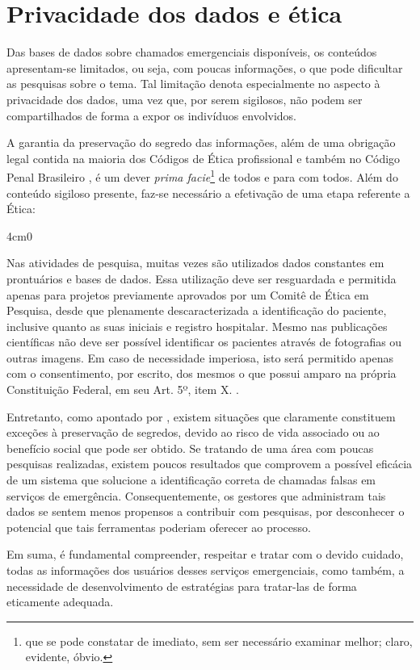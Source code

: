 \section{Privacidade dos dados e ética}
Das bases de dados sobre chamados emergenciais disponíveis, os conteúdos apresentam-se limitados, ou seja, com poucas informações, o que pode dificultar as pesquisas sobre o tema. Tal limitação denota  especialmente no aspecto à privacidade dos dados, uma vez que, por serem sigilosos, não podem ser compartilhados de forma a expor os indivíduos envolvidos.

A garantia da preservação do segredo das informações, além de uma obrigação legal contida na maioria dos Códigos de Ética profissional e também no Código Penal Brasileiro \citep{cp340}, é um dever \textit{prima facie}\footnote{que se pode constatar de imediato, sem ser necessário examinar melhor; claro, evidente, óbvio.} de todos e para com todos. Além do conteúdo sigiloso presente, faz-se necessário a efetivação de uma etapa referente a Ética:

\renewenvironment{quote}[1][1em]
  {\begin{adjustwidth}{#1}{0}}
  {\end{adjustwidth}}
\begin{quote}[4cm]
\begin{singlespace}
{\footnotesize  
Nas atividades de pesquisa, muitas vezes são utilizados dados constantes em prontuários e bases de dados. Essa utilização deve ser resguardada e permitida apenas para projetos previamente aprovados por um Comitê de Ética em Pesquisa, desde que plenamente descaracterizada a identificação do paciente, inclusive quanto as suas iniciais e registro hospitalar. Mesmo nas publicações científicas não deve ser possível identificar os pacientes através de fotografias ou outras imagens. Em caso de necessidade imperiosa, isto será permitido apenas com o consentimento, por escrito, dos mesmos o que possui amparo na própria Constituição Federal, em seu Art. 5º, item X. \citep{francisconi1998aspectos}.
}
\end{singlespace}
\end{quote}

Entretanto, como apontado por \cite{francisconi1998aspectos}, existem situações que claramente constituem exceções à preservação de segredos, devido ao risco de vida associado ou ao benefício social que pode ser obtido. Se tratando de uma área com poucas pesquisas realizadas, existem poucos resultados que comprovem a possível eficácia de um sistema que solucione a identificação correta de chamadas falsas em serviços de emergência. Consequentemente, os gestores que administram tais dados se sentem menos propensos a contribuir com pesquisas, por desconhecer o potencial que tais ferramentas poderiam oferecer ao processo.

Em suma, é fundamental compreender, respeitar e tratar com o devido cuidado, todas as informações dos usuários desses serviços emergenciais, como também, a necessidade de desenvolvimento de estratégias para tratar-las de forma eticamente adequada.